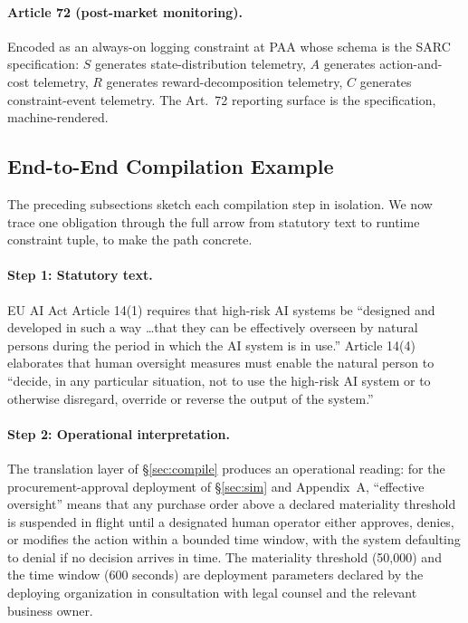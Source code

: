 \documentclass[11pt,a4paper]{article}
\theoremstyle{remark}
\begin{document}
\paragraph{Article 72 (post-market monitoring).} Encoded as an always-on logging constraint at PAA whose schema is the SARC specification: $S$ generates state-distribution telemetry, $A$ generates action-and-cost telemetry, $R$ generates reward-decomposition telemetry, $C$ generates constraint-event telemetry. The Art.~72 reporting surface is the specification, machine-rendered.

\subsection{End-to-End Compilation Example}\label{sec:e2e}

The preceding subsections sketch each compilation step in isolation. We now trace one obligation through the full arrow from statutory text to runtime constraint tuple, to make the path concrete.

\paragraph{Step 1: Statutory text.} EU AI Act Article 14(1) requires that high-risk AI systems be ``designed and developed in such a way \ldots that they can be effectively overseen by natural persons during the period in which the AI system is in use.'' Article 14(4) elaborates that human oversight measures must enable the natural person to ``decide, in any particular situation, not to use the high-risk AI system or to otherwise disregard, override or reverse the output of the system.''

\paragraph{Step 2: Operational interpretation.} The translation layer of \S\ref{sec:compile} produces an operational reading: for the procurement-approval deployment of \S\ref{sec:sim} and Appendix~A, ``effective oversight'' means that any purchase order above a declared materiality threshold is suspended in flight until a designated human operator either approves, denies, or modifies the action within a bounded time window, with the system defaulting to denial if no decision arrives in time. The materiality threshold (\texteuro{}50{,}000) and the time window (600 seconds) are deployment parameters declared by the deploying organization in consultation with legal counsel and the relevant business owner.
\end{document}
